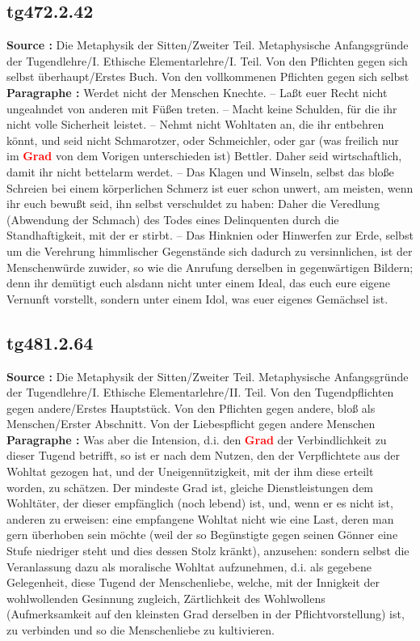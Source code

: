 \documentclass[a4paper,12pt,twoside]{book}
\newcommand{\match}[1]{\textcolor{red}{\textbf{#1}}}
\begin{document}
	\subsection*{tg472.2.42} 
	\textbf{Source : }Die Metaphysik der Sitten/Zweiter Teil. Metaphysische Anfangsgründe der Tugendlehre/I. Ethische Elementarlehre/I. Teil. Von den Pflichten gegen sich selbst überhaupt/Erstes Buch. Von den vollkommenen Pflichten gegen sich selbst\\  
	
	\textbf{Paragraphe : }Werdet nicht der Menschen Knechte. – Laßt euer Recht nicht ungeahndet von anderen mit Füßen treten. – Macht keine Schulden, für die ihr nicht volle Sicherheit leistet. – Nehmt nicht Wohltaten an, die ihr entbehren könnt, und seid nicht Schmarotzer, oder Schmeichler, oder gar (was freilich nur im \match{Grad} von dem Vorigen unterschieden ist) Bettler. Daher seid wirtschaftlich, damit ihr nicht bettelarm werdet. – Das Klagen und Winseln, selbst das bloße Schreien bei einem körperlichen Schmerz ist euer schon unwert, am meisten, wenn ihr euch bewußt seid, ihn selbst verschuldet zu haben: Daher die Veredlung (Abwendung der Schmach) des Todes eines Delinquenten durch die Standhaftigkeit, mit der er stirbt. – Das Hinknien oder Hinwerfen zur Erde, selbst um die Verehrung himmlischer Gegenstände sich dadurch zu versinnlichen, ist der Menschenwürde zuwider, so wie die Anrufung derselben in gegenwärtigen Bildern; denn ihr demütigt euch alsdann nicht unter einem Ideal, das euch eure eigene Vernunft vorstellt, sondern unter einem Idol, was euer eigenes Gemächsel ist. 
	
	\subsection*{tg481.2.64} 
	\textbf{Source : }Die Metaphysik der Sitten/Zweiter Teil. Metaphysische Anfangsgründe der Tugendlehre/I. Ethische Elementarlehre/II. Teil. Von den Tugendpflichten gegen andere/Erstes Hauptstück. Von den Pflichten gegen andere, bloß als Menschen/Erster Abschnitt. Von der Liebespflicht gegen andere Menschen\\  
	
	\textbf{Paragraphe : }Was aber die Intension, d.i. den \match{Grad} der Verbindlichkeit zu dieser Tugend betrifft, so ist er nach dem Nutzen, den der Verpflichtete aus der Wohltat gezogen hat, und der Uneigennützigkeit, mit der ihm diese erteilt worden, zu schätzen. Der mindeste Grad ist, gleiche Dienstleistungen dem Wohltäter, der dieser empfänglich (noch lebend) ist, und, wenn er es nicht ist, anderen zu erweisen: eine empfangene Wohltat nicht wie eine Last, deren man gern überhoben sein möchte (weil der so Begünstigte gegen seinen Gönner eine Stufe niedriger steht und dies dessen Stolz kränkt), anzusehen: sondern selbst die Veranlassung dazu als moralische Wohltat aufzunehmen, d.i. als gegebene Gelegenheit, diese Tugend der Menschenliebe, welche, mit der Innigkeit der wohlwollenden Gesinnung zugleich, Zärtlichkeit des Wohlwollens (Aufmerksamkeit auf den kleinsten Grad derselben in der Pflichtvorstellung) ist, zu verbinden und so die Menschenliebe zu kultivieren. 
	
\end{document}
